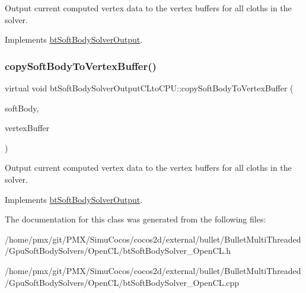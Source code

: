 Output current computed vertex data to the vertex buffers for all cloths in the solver. 

Implements \hyperlink{classbtSoftBodySolverOutput_a7c3761747267f87da347aad276218663}{bt\+Soft\+Body\+Solver\+Output}.

\mbox{\label{classbtSoftBodySolverOutputCLtoCPU_a0bffbe9f32160155ff56e90a0d8f547b}} 
\subsubsection{\texorpdfstring{copy\+Soft\+Body\+To\+Vertex\+Buffer()}{copySoftBodyToVertexBuffer()}\hspace{0.1cm}{\footnotesize\ttfamily [2/2]}}
{\footnotesize\ttfamily virtual void bt\+Soft\+Body\+Solver\+Output\+C\+Lto\+C\+P\+U\+::copy\+Soft\+Body\+To\+Vertex\+Buffer (\begin{DoxyParamCaption}\item[{const \hyperlink{classbtSoftBody}{bt\+Soft\+Body} $\ast$const}]{soft\+Body,  }\item[{\hyperlink{classbtVertexBufferDescriptor}{bt\+Vertex\+Buffer\+Descriptor} $\ast$}]{vertex\+Buffer }\end{DoxyParamCaption})\hspace{0.3cm}{\ttfamily [virtual]}}

Output current computed vertex data to the vertex buffers for all cloths in the solver. 

Implements \hyperlink{classbtSoftBodySolverOutput_a7c3761747267f87da347aad276218663}{bt\+Soft\+Body\+Solver\+Output}.



The documentation for this class was generated from the following files\+:\begin{DoxyCompactItemize}
\item 
/home/pmx/git/\+P\+M\+X/\+Simu\+Cocos/cocos2d/external/bullet/\+Bullet\+Multi\+Threaded/\+Gpu\+Soft\+Body\+Solvers/\+Open\+C\+L/bt\+Soft\+Body\+Solver\+\_\+\+Open\+C\+L.\+h\item 
/home/pmx/git/\+P\+M\+X/\+Simu\+Cocos/cocos2d/external/bullet/\+Bullet\+Multi\+Threaded/\+Gpu\+Soft\+Body\+Solvers/\+Open\+C\+L/bt\+Soft\+Body\+Solver\+\_\+\+Open\+C\+L.\+cpp\end{DoxyCompactItemize}
